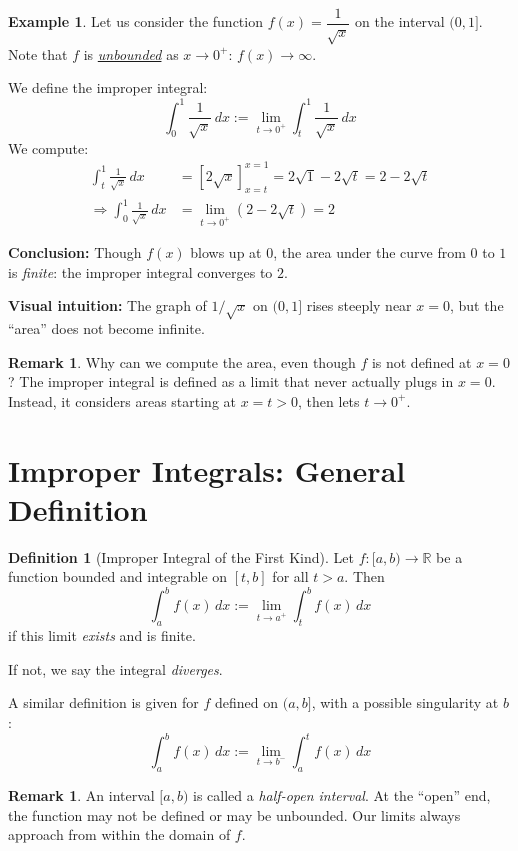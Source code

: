 \documentclass[11pt,oneside]{article}
\theoremstyle{definition}
\newtheorem{definition}[theorem]{Definition}
\newtheorem{example}[theorem]{Example}
\newtheorem{remark}[theorem]{Remark}
\theoremstyle{remark}
\begin{document}
\begin{example}
Let us consider the function $f(x) = \dfrac{1}{\sqrt{x}}$ on the interval $(0,1]$. Note that $f$ is \href{https://en.wikipedia.org/wiki/Unbounded_function}{\emph{unbounded}} as $x \to 0^+$: $f(x) \to \infty$.

We define the improper integral:
\[
\int_0^1 \frac{1}{\sqrt{x}}\,dx := \lim_{t\to 0^+} \int_t^1 \frac{1}{\sqrt{x}}\,dx
\]
We compute:
\begin{align*}
\int_t^1 \frac{1}{\sqrt{x}}\,dx
    &= \left[2\sqrt{x}\right]_{x=t}^{x=1} = 2\sqrt{1} - 2\sqrt{t} = 2 - 2\sqrt{t} \\
\Rightarrow \int_0^1 \frac{1}{\sqrt{x}}\,dx
    &= \lim_{t\to 0^+} (2 - 2\sqrt{t}) = 2
\end{align*}

\textbf{Conclusion:} Though $f(x)$ blows up at $0$, the area under the curve from $0$ to $1$ is \emph{finite}: the improper integral converges to $2$.

\textbf{Visual intuition:} The graph of $1/\sqrt{x}$ on $(0,1]$ rises steeply near $x=0$, but the ``area'' does not become infinite.
\end{example}

\begin{remark}
Why can we compute the area, even though $f$ is not defined at $x=0$? The improper integral is defined as a limit that never actually plugs in $x=0$. Instead, it considers areas starting at $x=t>0$, then lets $t \to 0^+$.
\end{remark}

\section{Improper Integrals: General Definition}

\begin{definition}[Improper Integral of the First Kind]
Let $f:[a, b) \to \mathbb{R}$ be a function bounded and integrable on $[t, b]$ for all $t > a$. Then
\[
\int_a^b f(x)\,dx := \lim_{t \to a^+} \int_t^b f(x)\,dx
\]
if this limit \emph{exists} and is finite.

If not, we say the integral \emph{diverges}.
\end{definition}

A similar definition is given for $f$ defined on $(a, b]$, with a possible singularity at $b$:
\[
\int_a^b f(x)\,dx := \lim_{t \to b^-} \int_a^t f(x)\,dx
\]

\begin{remark}
An interval $[a, b)$ is called a \emph{half-open interval}. At the ``open'' end, the function may not be defined or may be unbounded. Our limits always approach from within the domain of $f$.
\end{remark}
\end{document}
